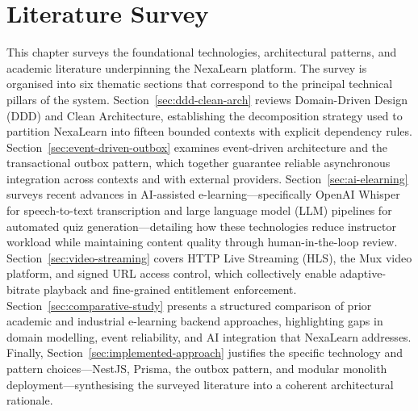
\chapter{Literature Survey}
\label{ch:literature-survey}

This chapter surveys the foundational technologies, architectural patterns, and academic literature underpinning the NexaLearn platform. The survey is organised into six thematic sections that correspond to the principal technical pillars of the system. Section~\ref{sec:ddd-clean-arch} reviews Domain-Driven Design (DDD) and Clean Architecture, establishing the decomposition strategy used to partition NexaLearn into fifteen bounded contexts with explicit dependency rules. Section~\ref{sec:event-driven-outbox} examines event-driven architecture and the transactional outbox pattern, which together guarantee reliable asynchronous integration across contexts and with external providers. Section~\ref{sec:ai-elearning} surveys recent advances in AI-assisted e-learning---specifically OpenAI Whisper for speech-to-text transcription and large language model (LLM) pipelines for automated quiz generation---detailing how these technologies reduce instructor workload while maintaining content quality through human-in-the-loop review. Section~\ref{sec:video-streaming} covers HTTP Live Streaming (HLS), the Mux video platform, and signed URL access control, which collectively enable adaptive-bitrate playback and fine-grained entitlement enforcement. Section~\ref{sec:comparative-study} presents a structured comparison of prior academic and industrial e-learning backend approaches, highlighting gaps in domain modelling, event reliability, and AI integration that NexaLearn addresses. Finally, Section~\ref{sec:implemented-approach} justifies the specific technology and pattern choices---NestJS, Prisma, the outbox pattern, and modular monolith deployment---synthesising the surveyed literature into a coherent architectural rationale.







